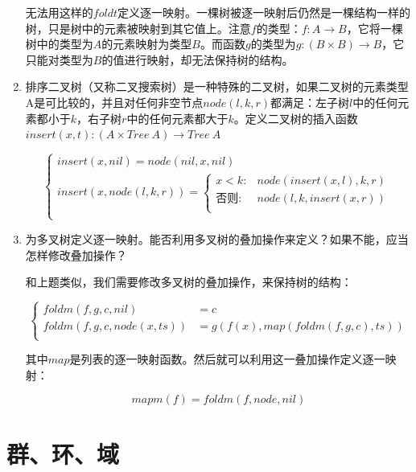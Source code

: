\documentclass[UTF8]{article}
\begin{document}
\begin{enumerate}
无法用这样的$foldt$定义逐一映射。一棵树被逐一映射后仍然是一棵结构一样的树，只是树中的元素被映射到其它值上。注意$f$的类型：$f : A \to B$，它将一棵树中的类型为$A$的元素映射为类型$B$。而函数$g$的类型为$g : (B \times B) \to B$，它只能对类型为$B$的值进行映射，却无法保持树的结构。

\item 排序二叉树（又称二叉搜索树）是一种特殊的二叉树，如果二叉树的元素类型A是可比较的，并且对任何非空节点$node(l, k, r)$都满足：左子树$l$中的任何元素都小于$k$，右子树$r$中的任何元素都大于$k$。定义二叉树的插入函数$insert(x, t) : (A \times Tree\ A) \to Tree\ A$

\[ \begin{cases}
insert(x, nil) = node(nil, x, nil) \\
insert(x, node(l, k, r)) = \begin{cases}
  x < k: & node(insert(x, l), k, r) \\
  \text{否则}: & node(l, k, insert(x, r)) \\
\end{cases} \\
\end{cases}\]

\item 为多叉树定义逐一映射。能否利用多叉树的叠加操作来定义？如果不能，应当怎样修改叠加操作？

和上题类似，我们需要修改多叉树的叠加操作，来保持树的结构：

\[
\begin{cases}
foldm(f, g, c, nil) & = c \\
foldm(f, g, c, node(x, ts)) & = g(f(x), map(foldm(f, g, c), ts)) \\
\end{cases}
\]

其中$map$是列表的逐一映射函数。然后就可以利用这一叠加操作定义逐一映射：

\[
mapm(f) = foldm(f, node, nil)
\]

\end{enumerate}

\section{群、环、域}
\end{document}
